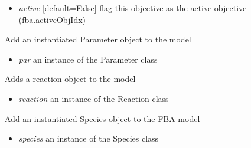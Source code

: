 \documentclass[a4paper,11pt,english]{sphinxmanual}
\begin{document}
\begin{fulllineitems}
\begin{fulllineitems}
\begin{itemize}
\item {} 
\emph{active} {[}default=False{]} flag this objective as the active objective (fba.activeObjIdx)

\end{itemize}

\end{fulllineitems}


\begin{fulllineitems}
\label{modules_doc:cbmpy.CBModel.Model.addParameter}
Add an instantiated Parameter object to the model
\begin{itemize}
\item {} 
\emph{par} an instance of the Parameter class

\end{itemize}

\end{fulllineitems}


\begin{fulllineitems}
\label{modules_doc:cbmpy.CBModel.Model.addReaction}
Adds a reaction object to the model
\begin{itemize}
\item {} 
\emph{reaction} an instance of the Reaction class

\end{itemize}

\end{fulllineitems}


\begin{fulllineitems}
\label{modules_doc:cbmpy.CBModel.Model.addSpecies}
Add an instantiated Species object to the FBA model
\begin{itemize}
\item {} 
\emph{species} an instance of the Species class

\end{itemize}

\end{fulllineitems}



\end{fulllineitems}
\end{document}
